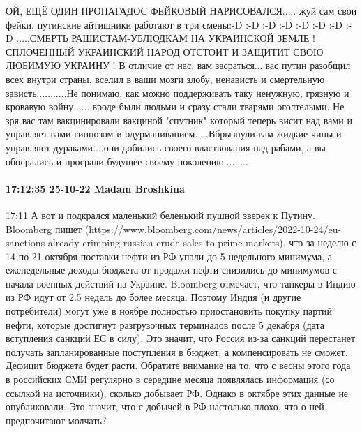 ОЙ, ЕЩЁ ОДИН ПРОПАГАДОС ФЕЙКОВЫЙ НАРИСОВАЛСЯ..... жуй сам свои фейки, путинские
айтишники работают в три смены:-D :-D :-D :-D :-D :-D :-D :-D .....СМЕРТЬ
РАШИСТАМ-УБЛЮДКАМ НА УКРАИНСКОЙ ЗЕМЛЕ ! СПЛОЧЕННЫЙ УКРАИНСКИЙ НАРОД ОТСТОИТ И
ЗАЩИТИТ СВОЮ ЛЮБИМУЮ УКРАИНУ ! В отличие от нас, вам засраться....вас путин
разобщил всех внутри страны, вселил в ваши мозги злобу, ненависть и смертельную
зависть...........Не понимаю, как можно поддерживать таку ненужную, грязную и
кровавую войну.......вроде были людьми и сразу стали тварями оголтелыми. Не зря
вас там вакцинировали вакциной "спутник" который теперь висит над вами и
управляет вами гипнозом и одурманиванием.....Вбрызнули вам жидкие чипы и
управляют дураками....они добились своего властвования над рабами, а вы
обосрались и просрали будущее своему поколению.........

\paragraph{17:12:35 25-10-22 Madam Broshkina}
17:11
А вот и подкрался маленький беленький пушной зверек к Путину.
Bloomberg пишет (https://www.bloomberg.com/news/articles/2022-10-24/eu-sanctions-already-crimping-russian-crude-sales-to-prime-markets), что за неделю с 14 по 21 октября поставки нефти из РФ упали до 5-недельного минимума, а еженедельные доходы бюджета от продажи нефти снизились до минимумов с начала военных действий на Украине.
Bloomberg отмечает, что танкеры в Индию из РФ идут от 2.5 недель до более месяца. Поэтому Индия (и другие потребители) могут уже в ноябре полностью приостановить покупку партий нефти, которые достигнут разгрузочных терминалов после 5 декабря (дата вступления санкций ЕС в силу). Это значит, что Россия из-за санкций перестанет получать запланированные поступления в бюджет, а компенсировать не сможет. Дефицит бюджета будет расти.
Обратите внимание на то, что с весны этого года в российских СМИ регулярно в середине месяца появлялась информация (со ссылкой на источники), сколько добывает РФ. Однако в октябре этих данные не опубликовали. Это значит, что с добычей в РФ настолько плохо, что о ней предпочитают молчать?

